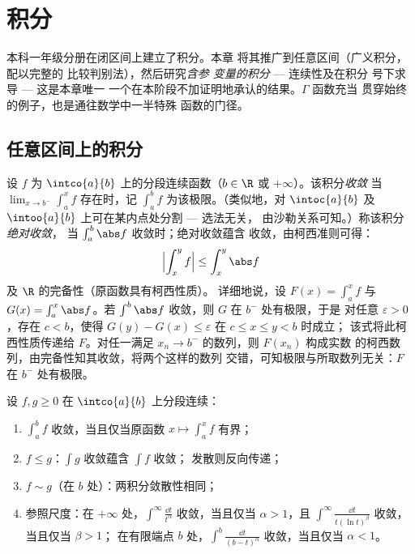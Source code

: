 \chapter{积分}\label{ch:b2:integration}

本科一年级分册在闭区间上建立了积分。本章
将其推广到任意区间（广义积分，配以完整的
比较判别法），然后研究\emph{含参
变量的积分} --- 连续性及在积分
号下求导 --- 这是本章唯一
一个在本阶段不加证明地承认的结果。$\Gamma$ 函数充当
贯穿始终的例子，也是通往数学中一半特殊
函数的门径。

\section{任意区间上的积分}

\begin{definition}\label{def:b2:integration:improper}
设 $f$ 为 $\intco{a}{b}$ 上的分段连续函数（$b \in \R$ 或
$+\infty$）。该积分\emph{收敛}
当 $\lim_{x \to b^-} \int_a^x f$ 存在时，记
$\int_a^b f$ 为该极限。（类似地，对 $\intoc{a}{b}$ 及
$\intoo{a}{b}$ 上可在某内点处分割 --- 选法无关，
由沙勒关系可知。）称该积分\emph{绝对收敛}，
当 $\int_a^b \abs f$ 收敛时；绝对收敛蕴含
收敛，由柯西准则可得：
\[
\Bigl| \int_x^{y} f \Bigr| \leq \int_x^{y} \abs f
\]
及 $\R$ 的完备性（原函数具有柯西性质）。
详细地说，设 $F(x) = \int_a^x f$ 与 $G(x) = \int_a^x \abs
f$。若 $\int^b\abs f$ 收敛，则 $G$ 在 $b^-$ 处有极限，于是
对任意 $\varepsilon > 0$，存在 $c < b$，使得 $G(y) - G(x)
\leq \varepsilon$ 在 $c \leq x \leq y < b$ 时成立；
该式将此柯西性质传递给 $F$。对任一满足 $x_n
\to b^-$ 的数列，则 $F(x_n)$ 构成实数
的柯西数列，由完备性知其收敛，将两个这样的数列
交错，可知极限与所取数列无关：$F$ 在
$b^-$ 处有极限。
\end{definition}

\begin{theorem}[非负比较判别法]\label{thm:b2:integration:comparison}
设 $f, g \geq 0$ 在 $\intco{a}{b}$ 上分段连续：
\begin{enumerate}
  \item $\int_a^b f$ 收敛，当且仅当原函数 $x \mapsto \int_a^x
        f$ 有界；
  \item $f \leq g$：$\int g$ 收敛蕴含 $\int f$ 收敛；
        发散则反向传递；
  \item $f \sim g$（在 $b$ 处）：两积分敛散性相同；
  \item 参照尺度：在 $+\infty$ 处，$\int^{\infty}
        \frac{\dd t}{t^\alpha}$ 收敛，当且仅当 $\alpha > 1$，且
        $\int^\infty \frac{\dd t}{t(\ln t)^\beta}$ 收敛，当且仅当 $\beta > 1$；
        在有限端点 $b$ 处，$\int^b \frac{\dd t}{(b -
        t)^\alpha}$ 收敛，当且仅当 $\alpha < 1$。
\end{enumerate}
\end{theorem}

